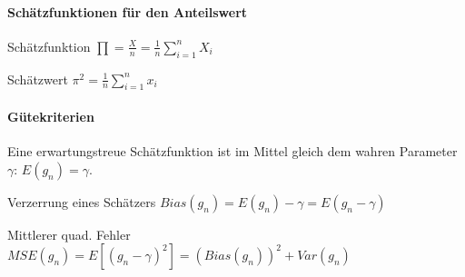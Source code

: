 \documentclass[a4paper]{article}
\begin{document}
\begin{multicols}{3}
  \paragraph{ Schätzfunktionen für den Anteilswert}
  \begin{itemize*}
    \item Schätzfunktion $\prod=\frac{X}{n}=\frac{1}{n}\sum_{i=1}^n X_i$
    \item Schätzwert $\pi^2=\frac{1}{n}\sum_{i=1}^n x_i$
  \end{itemize*}

  \paragraph{ Gütekriterien}
  Eine erwartungstreue Schätzfunktion ist im Mittel gleich dem wahren Parameter $\gamma$: $E(g_n)=\gamma$.

  Verzerrung eines Schätzers $Bias(g_n)=E(g_n)-\gamma = E(g_n - \gamma)$

  Mittlerer quad. Fehler $MSE(g_n)=E[(g_n-\gamma)^2]=(Bias(g_n))^2 + Var(g_n)$

\end{multicols}
\end{document}
